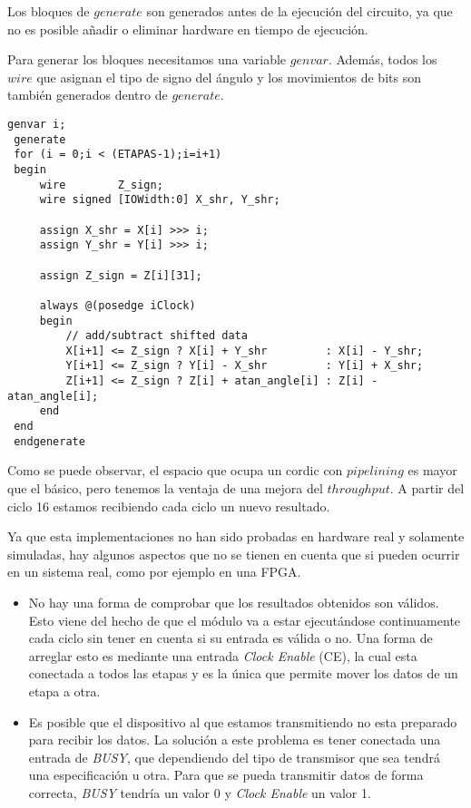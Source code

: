 Los bloques de $generate$ son generados antes de la ejecución del circuito, ya que no es posible añadir o eliminar hardware en tiempo de ejecución.

Para generar los bloques necesitamos una variable $genvar$. Además, todos los $wire$ que asignan el tipo de signo del ángulo y los movimientos de bits son también generados dentro de $generate$.

\begin{lstlisting}[caption={Ejecución principal de \gls{cordic} con \textit{pipelining}}]
 genvar i;
 generate
 for (i = 0;i < (ETAPAS-1);i=i+1) 
 begin
     wire        Z_sign;
     wire signed [IOWidth:0] X_shr, Y_shr;

     assign X_shr = X[i] >>> i; 
     assign Y_shr = Y[i] >>> i;

     assign Z_sign = Z[i][31];
         
     always @(posedge iClock)
     begin
         // add/subtract shifted data
         X[i+1] <= Z_sign ? X[i] + Y_shr         : X[i] - Y_shr;
         Y[i+1] <= Z_sign ? Y[i] - X_shr         : Y[i] + X_shr;
         Z[i+1] <= Z_sign ? Z[i] + atan_angle[i] : Z[i] - atan_angle[i];
     end 
 end     
 endgenerate
\end{lstlisting}

Como se puede observar, el espacio que ocupa un \gls{cordic} con $pipelining$ es mayor que el básico, pero tenemos la ventaja de una mejora del $throughput$. A partir del ciclo 16 estamos recibiendo cada ciclo un nuevo resultado.

Ya que esta implementaciones no han sido probadas en hardware real y solamente simuladas, hay algunos aspectos que no se tienen en cuenta que si pueden ocurrir en un sistema real, como por ejemplo en una FPGA.

\begin{itemize}
	\item No hay una forma de comprobar que los resultados obtenidos son válidos. Esto viene del hecho de que el módulo va a estar ejecutándose continuamente cada ciclo sin tener en cuenta si su entrada es válida o no. Una forma de arreglar esto es mediante una entrada \textit{Clock Enable} (CE), la cual esta conectada a todos las etapas y es la única que permite mover los datos de un etapa a otra.
	
	\item Es posible que el dispositivo al que estamos transmitiendo no esta preparado para recibir los datos. La solución a este problema es tener conectada una entrada de \textit{BUSY}, que dependiendo del tipo de transmisor que sea tendrá una especificación u otra. Para que se pueda transmitir datos de forma correcta, \textit{BUSY} tendría un valor 0 y \textit{Clock Enable} un valor 1.
\end{itemize}
 

